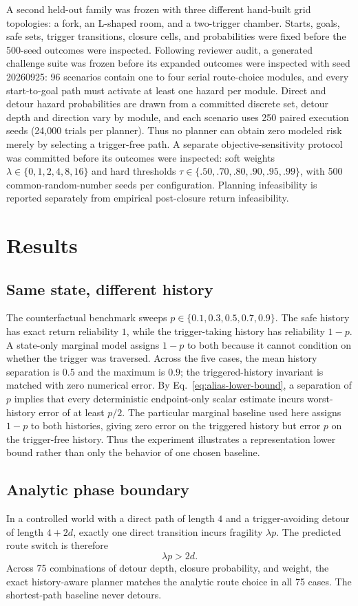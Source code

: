 \documentclass[conference]{IEEEtran}
\begin{document}
A second held-out family was frozen with three different hand-built grid topologies: a fork, an L-shaped room, and a two-trigger chamber. Starts, goals, safe sets, trigger transitions, closure cells, and probabilities were fixed before the 500-seed outcomes were inspected. Following reviewer audit, a generated challenge suite was frozen before its expanded outcomes were inspected with seed 20260925: 96 scenarios contain one to four serial route-choice modules, and every start-to-goal path must activate at least one hazard per module. Direct and detour hazard probabilities are drawn from a committed discrete set, detour depth and direction vary by module, and each scenario uses 250 paired execution seeds (24,000 trials per planner). Thus no planner can obtain zero modeled risk merely by selecting a trigger-free path. A separate objective-sensitivity protocol was committed before its outcomes were inspected: soft weights $\lambda\in\{0,1,2,4,8,16\}$ and hard thresholds $\tau\in\{.50,.70,.80,.90,.95,.99\}$, with 500 common-random-number seeds per configuration. Planning infeasibility is reported separately from empirical post-closure return infeasibility.

\section{Results}
\subsection{Same state, different history}
The counterfactual benchmark sweeps $p\in\{0.1,0.3,0.5,0.7,0.9\}$. The safe history has exact return reliability $1$, while the trigger-taking history has reliability $1-p$. A state-only marginal model assigns $1-p$ to both because it cannot condition on whether the trigger was traversed. Across the five cases, the mean history separation is $0.5$ and the maximum is $0.9$; the triggered-history invariant is matched with zero numerical error. By Eq.~\eqref{eq:alias-lower-bound}, a separation of $p$ implies that every deterministic endpoint-only scalar estimate incurs worst-history error of at least $p/2$. The particular marginal baseline used here assigns $1-p$ to both histories, giving zero error on the triggered history but error $p$ on the trigger-free history. Thus the experiment illustrates a representation lower bound rather than only the behavior of one chosen baseline.

\subsection{Analytic phase boundary}
In a controlled world with a direct path of length $4$ and a trigger-avoiding detour of length $4+2d$, exactly one direct transition incurs fragility $\lambda p$. The predicted route switch is therefore
\begin{equation}
\lambda p>2d.
\end{equation}
Across 75 combinations of detour depth, closure probability, and weight, the exact history-aware planner matches the analytic route choice in all 75 cases. The shortest-path baseline never detours.
\end{document}
